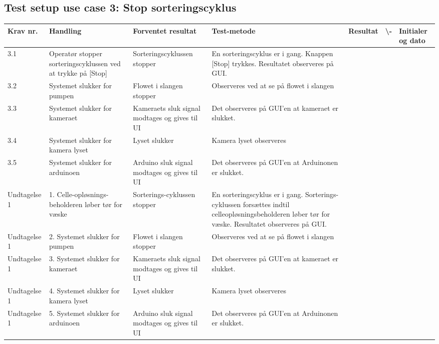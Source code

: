   \subsection{Test setup use case 3: Stop sorteringscyklus}
\begin{center}
		\begin{longtable}{ | m{1.785cm} | m{1.785cm}| m{1.785cm}| m{1.785cm}| m{1.785cm}| m{1.785cm}|m{1.785cm}| } 
			\hline
			\textbf{Krav nr.} &\textbf{ Handling} & \textbf{Forventet resultat} & \textbf{Test-metode} &\textbf{Resultat} & \textbf{ \checkmark \textbackslash -} & \textbf{Initialer og dato} \\ 
			
			\hline
			3.1 &  Operatør stopper sorteringscyklussen ved at trykke på [Stop] & Sorteringscyklussen stopper & En sorteringscyklus er i gang. Knappen [Stop] trykkes. Resultatet observeres på GUI.  &  & & \\
			\hline
			
			\hline
			3.2 &  Systemet slukker for pumpen & Flowet i slangen stopper & Observeres ved at se på flowet i slangen &  & & \\
			\hline
			
			3.3 &  Systemet slukker for kameraet  & Kameraets sluk signal modtages og gives til UI & Det observeres på GUI’en at kameraet er slukket.  &  & & \\
			\hline
			
			3.4 &  Systemet slukker for kamera lyset  & Lyset slukker & Kamera lyset observeres  &  & & \\
			\hline
			
			3.5 &  Systemet slukker for arduinoen & Arduino sluk signal modtages og gives til UI & Det observeres på GUI’en at Arduinonen er slukket. &  & & \\
			\hline
			
			Undtagelse 1 &  1. Celle-opløsnings-beholderen løber tør for væske & Sorterings-cyklussen stopper & En sorteringscyklus er i gang. Sorterings-cyklussen forsættes indtil celleopløsningsbeholderen løber tør for væske. Resultatet observeres på GUI.  & & \\
			\hline
			
	
			Undtagelse 1 &  2. Systemet slukker for pumpen & Flowet i slangen stopper & Observeres ved at se på flowet i slangen &  & & \\
			\hline
			
			Undtagelse 1 &  3. Systemet slukker for kameraet  & Kameraets sluk signal modtages og gives til UI & Det observeres på GUI’en at kameraet er slukket.  &  & & \\
			\hline
			
			Undtagelse 1 &  4. Systemet slukker for kamera lyset  & Lyset slukker & Kamera lyset observeres  &  & & \\
			\hline
			
			Undtagelse 1 &  5. Systemet slukker for arduinoen & Arduino sluk signal modtages og gives til UI & Det observeres på GUI’en at Arduinonen er slukket. &  & & \\
			\hline			
			
		\end{longtable}
		
	\end{center}
	\pagebreak